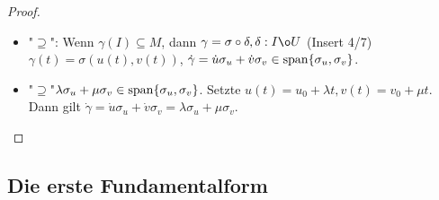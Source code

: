\documentclass[11pt]{article}
\begin{document}
\begin{proof}~
\begin{itemize}
    \item "$\supseteq$": Wenn $\gamma(I)\subseteq M$, dann $\gamma = \sigma\circ \delta, \delta : I\o U$ (Insert 4/7)
    $\gamma(t) = \sigma(u(t),v(t))$, $\dot\gamma = \dot u\sigma_u + \dot v\sigma_v\in \mathrm{span}\{\sigma_u,\sigma_v\}$.
    \item "$\supseteq$"$\lambda\sigma_u + \mu \sigma_v\in \mathrm{span}\{\sigma_u,\sigma_v\}$. Setzte $u(t) = u_0 + \lambda t, v(t) = v_0 + \mu t$. Dann gilt $\dot\gamma = \dot u \sigma_u + \dot v \sigma_v = \lambda \sigma_u + \mu \sigma_v$.
\end{itemize}
\end{proof}

\subsection{Die erste Fundamentalform}
\end{document}
